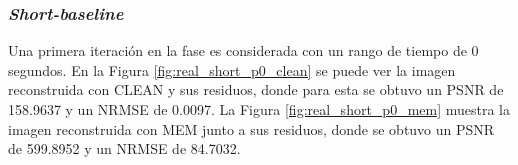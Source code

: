 \subsubsection{\textit{Short-baseline}}

 Una primera iteración en la fase es considerada con un rango de tiempo de 0 segundos. En la Figura \ref{fig:real_short_p0_clean} se puede ver la imagen reconstruida con CLEAN y sus residuos, donde para esta se obtuvo un PSNR de 158.9637 y un NRMSE de 0.0097. La Figura \ref{fig:real_short_p0_mem} muestra la imagen reconstruida con MEM junto a sus residuos, donde se obtuvo un PSNR de 599.8952 y un NRMSE de 84.7032. 

\begin{figure}[!ht]
 \centering
    \vspace{0.3cm}

\end{figure}
